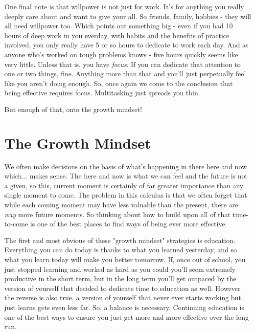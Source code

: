 \documentclass[11pt,a5paper]{book}
\begin{document}
One final note is that willpower is not just for work. It's for anything you really deeply care about and want to give your all. So friends, family, hobbies - they will all need willpower too. Which points out something big - even if you had 10 hours of deep work in you everday, with habits and the benefits of practice involved, you only really have 5 or so hours to dedicate to work each day. And as anyone who's worked on tough problems knows - five hours quickly seems like very little. Unless that is, you have \textit{focus}. If you can dedicate that attention to one or two things, fine. Anything more than that and you'll just perpetually feel like you aren't doing enough. So, once again we come to the conclusion that being effective requires focus. Multitasking just spreads you thin.
\newline

But enough of that, onto the growth mindset!

\section{The Growth Mindset}
We often make decisions on the basis of what's happening in there here and now which... makes sense. The here and now is what we can feel and the future is not a given, so this, current moment is certainly of far greater importance than any single moment to come. The problem in this calculus is that we often forget that while each coming moment may have less valuable than the present, there are \textit{way} more future moments. So thinking about how to build upon all of that time-to-come is one of the best places to find ways of being ever more effective.
\newline

The first and most obvious of these "growth mindset" strategies is education. Everything you can do today is thanks to what you learned yesterday, and so what you learn today will make you better tomorrow. If, once out of school, you just stopped learning and worked as hard as you could you'll seem extremely productive in the short term, but in the long term you'll get outpaced by the version of yourself that decided to dedicate time to education as well. However the reverse is also true, a version of yourself that never ever starts working but just learns gets even less far. So, a balance is necessary. Continuing education is one of the best ways to ensure you just get more and more effective over the long run. 
\newline
\end{document}
